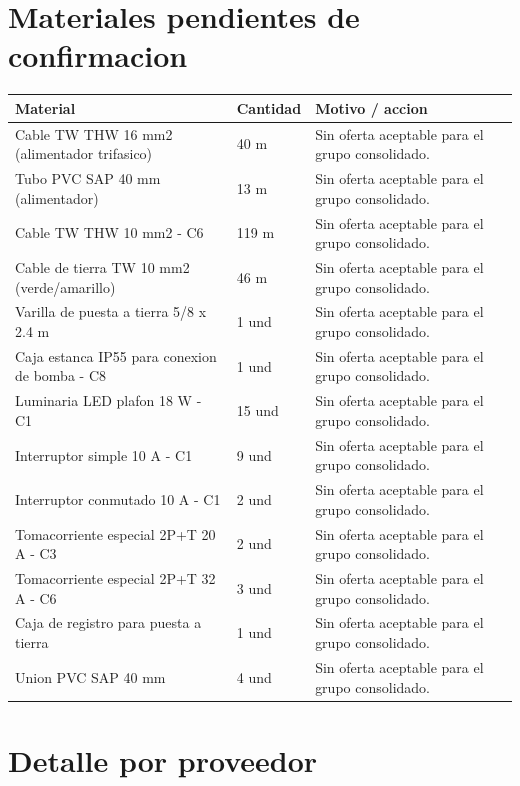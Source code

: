 \documentclass[11pt,a4paper]{article}
\begin{document}
\section{Materiales pendientes de confirmacion}
\begin{longtable}{p{} p{} p{}}
\toprule Material & Cantidad & Motivo / accion \\ \midrule\endhead
Cable TW THW 16 mm2 (alimentador trifasico) & 40 m & Sin oferta aceptable para el grupo consolidado. \\
Tubo PVC SAP 40 mm (alimentador) & 13 m & Sin oferta aceptable para el grupo consolidado. \\
Cable TW THW 10 mm2 - C6 & 119 m & Sin oferta aceptable para el grupo consolidado. \\
Cable de tierra TW 10 mm2 (verde/amarillo) & 46 m & Sin oferta aceptable para el grupo consolidado. \\
Varilla de puesta a tierra 5/8 x 2.4 m & 1 und & Sin oferta aceptable para el grupo consolidado. \\
Caja estanca IP55 para conexion de bomba - C8 & 1 und & Sin oferta aceptable para el grupo consolidado. \\
Luminaria LED plafon 18 W - C1 & 15 und & Sin oferta aceptable para el grupo consolidado. \\
Interruptor simple 10 A - C1 & 9 und & Sin oferta aceptable para el grupo consolidado. \\
Interruptor conmutado 10 A - C1 & 2 und & Sin oferta aceptable para el grupo consolidado. \\
Tomacorriente especial 2P+T 20 A - C3 & 2 und & Sin oferta aceptable para el grupo consolidado. \\
Tomacorriente especial 2P+T 32 A - C6 & 3 und & Sin oferta aceptable para el grupo consolidado. \\
Caja de registro para puesta a tierra & 1 und & Sin oferta aceptable para el grupo consolidado. \\
Union PVC SAP 40 mm & 4 und & Sin oferta aceptable para el grupo consolidado. \\
\bottomrule
\end{longtable}

\section{Detalle por proveedor}
\end{document}
